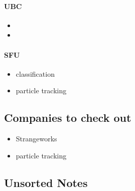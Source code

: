 \paragraph{UBC}
\begin{itemize}
  \item 
  \item 
\end{itemize}

\paragraph{SFU}
\begin{itemize}
  \item classification
  \item particle tracking
\end{itemize}


\subsection{Companies to check out}
\begin{itemize}
  \item Strangeworks
  \item particle tracking
\end{itemize}



\subsection{Unsorted Notes}

